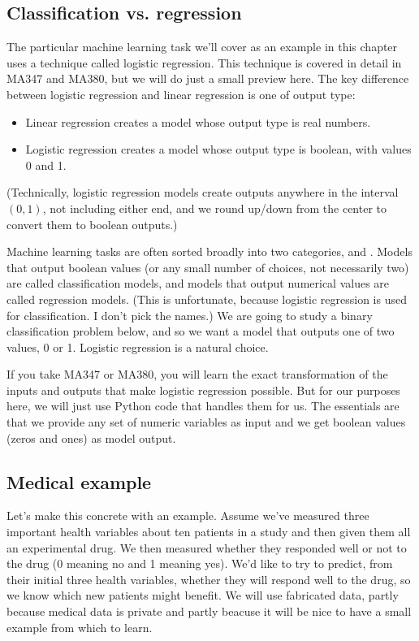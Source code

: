 \documentclass[letterpaper,10pt,english]{sphinxmanual}
\begin{document}
\subsection{Classification vs. regression}
\label{\detokenize{chapter-17-machine-learning:classification-vs-regression}}
The particular machine learning task we’ll cover as an example in this chapter uses a technique called logistic regression.  This technique is covered in detail in MA347 and MA380, but we will do just a small preview here.  The key difference between logistic regression and linear regression is one of output type:
\begin{itemize}
\item {} 
Linear regression creates a model whose output type is real numbers.

\item {} 
Logistic regression creates a model whose output type is boolean, with values 0 and 1.

\end{itemize}

(Technically, logistic regression models create outputs anywhere in the interval \((0,1)\), not including either end, and we round up/down from the center to convert them to boolean outputs.)

Machine learning tasks are often sorted broadly into two categories,  and .  Models that output boolean values (or any small number of choices, not necessarily two) are called classification models, and models that output numerical values are called regression models.  (This is unfortunate, because logistic regression is used for classification.  I don’t pick the names.)  We are going to study a binary classification problem below, and so we want a model that outputs one of two values, 0 or 1.  Logistic regression is a natural choice.

If you take MA347 or MA380, you will learn the exact transformation of the inputs and outputs that make logistic regression possible.  But for our purposes here, we will just use Python code that handles them for us.  The essentials are that we provide any set of numeric variables as input and we get boolean values (zeros and ones) as model output.


\subsection{Medical example}
\label{\detokenize{chapter-17-machine-learning:medical-example}}
Let’s make this concrete with an example.  Assume we’ve measured three important health variables about ten patients in a study and then given them all an experimental drug.  We then measured whether they responded well or not to the drug (0 meaning no and 1 meaning yes).  We’d like to try to predict, from their initial three health variables, whether they will respond well to the drug, so we know which new patients might benefit.  We will use fabricated data, partly because medical data is private and partly beacuse it will be nice to have a small example from which to learn.
\end{document}
